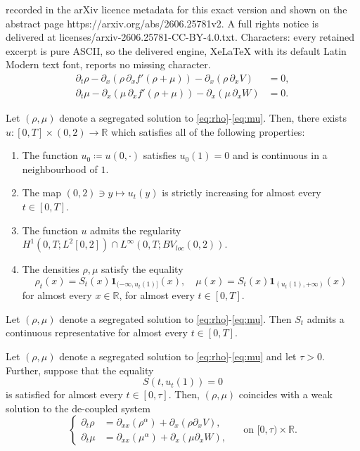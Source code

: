 \documentclass[10pt,a4paper]{amsart}
\newcommand{\R}{\mathbb{R}}
\newcommand{\one}{\mathbf{1}}
\begin{document}
recorded in the arXiv licence metadata for this exact version and shown on the abstract page https://arxiv.org/abs/2606.25781v2. A full rights notice is delivered at licenses/arxiv-2606.25781-CC-BY-4.0.txt. Characters: every retained excerpt is pure ASCII, so the delivered engine, XeLaTeX with its default Latin Modern text font, reports no missing character.
\begin{align}
\partial_t\rho - \partial_x(\rho\,\partial_x f'(\rho+\mu))- \partial_x (\rho\,\partial_x V) &= 0,\label{eq:rho}\\
\partial_t\mu  - \partial_x (\mu\,\partial_x f'(\rho+\mu))- \partial_x (\mu\,\partial_x W) &= 0.\label{eq:mu}
\end{align}

\begin{proposition}\label{propn:segregationproperties}
Let $(\rho,\mu)$ denote a segregated solution to \eqref{eq:rho}-\eqref{eq:mu}.
Then, there exists $u \colon [0,T]\times (0,2)\to \R $ which satisfies all of the following properties:
\begin{enumerate}
\item The function $u_0 \coloneqq u(0, \cdot )$ satisfies $u_0(1) = 0$ and is continuous in a neighbourhood of $1$.
\label{Prop4}
\item The map $ (0,2) \ni y \mapsto u_t(y) $ is strictly increasing for almost every $ t \in [0,T]$. 
\label{Prop2}
\item The function $u$ admits the regularity $ H^1(0,T;L^2[0,2]) \cap L^\infty(0,T; BV_{loc}(0,2))$.
\label{Prop3}
\item The densities $\rho,\mu$ satisfy the equality \[
\rho_t(x) = S_t(x)\one_{(-\infty,u_t(1)]}(x) , \quad  \mu(x) = S_t(x)\one_{(u_t(1),+\infty)}(x)
\]
for almost every $x \in \R$, for almost every $t \in [0,T]$.
\label{Prop1}
\end{enumerate}
\end{proposition}

\begin{proposition}\label{propn:sumcontinuity}
     Let $(\rho,\mu)$ denote a segregated solution to \eqref{eq:rho}-\eqref{eq:mu}.
     Then $S_t$ admits a continuous representative for almost every $t \in [0,T]$.
\end{proposition}

\begin{proposition}\label{propn:separate}
    Let $(\rho,\mu)$ denote a segregated solution to \eqref{eq:rho}-\eqref{eq:mu} and let $\tau > 0$. 
    Further, suppose that the equality
    \[
     S(t, u_t(1)) = 0
    \]
    is satisfied for almost every $t \in [0,\tau]$.
    Then, $(\rho,\mu)$ coincides with a weak solution to the de-coupled system
    \begin{equation}\label{eq:decoupled}
    \begin{cases}
        \partial_t \rho &= \partial_{xx}(\rho^\alpha) + \partial_x(\rho\partial_x V), \\
          \partial_t \mu &= \partial_{xx} (\mu^\alpha) + \partial_x(\mu\partial_x W),    
    \end{cases}
    \quad \text{ on } [0,\tau) \times \R.
    \end{equation}
\end{proposition}
\end{document}
